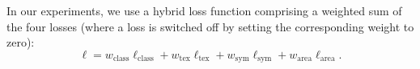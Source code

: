 \documentclass[runningheads]{llncs}
\begin{document}
In our experiments, we use a hybrid loss function comprising a weighted sum of the four losses (where a loss is switched off by setting the corresponding weight to zero):
\begin{equation}
    \ell = w_{\textrm{class}}\ell_{\textrm{class}} + w_{\textrm{tex}}\ell_{\textrm{tex}} + w_{\textrm{sym}}\ell_{\textrm{sym}} + w_{\textrm{area}}\ell_{\textrm{area}}.
\end{equation}









\end{document}
